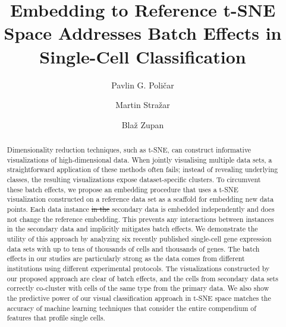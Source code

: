 \documentclass[runningheads]{llncs}
\providecommand{\DIFaddtex}[1]{{\protect\color{blue}\uwave{#1}}} %
\providecommand{\DIFdeltex}[1]{{\protect\color{red}\sout{#1}}}                      %
\providecommand{\DIFaddbegin}{} %
\providecommand{\DIFaddend}{} %
\providecommand{\DIFdelbegin}{} %
\providecommand{\DIFdelend}{} %
\providecommand{\DIFadd}[1]{\texorpdfstring{\DIFaddtex{#1}}{#1}} %
\providecommand{\DIFdel}[1]{\texorpdfstring{\DIFdeltex{#1}}{}} %
\newcommand{\DIFscaledelfig}{0.5}
\newlength{\DIFdelgraphicswidth} %
\newlength{\DIFdelgraphicsheight} %
\newcommand{\DIFaddincludegraphics}[2][]{{\color{blue}\fbox{\DIFOincludegraphics[#1]{#2}}}} %
\newcommand{\DIFdelincludegraphics}[2][]{%
\sbox{\DIFdelgraphicsbox}{\DIFOincludegraphics[#1]{#2}}%
\settoboxwidth{\DIFdelgraphicswidth}{\DIFdelgraphicsbox} %
\settoboxtotalheight{\DIFdelgraphicsheight}{\DIFdelgraphicsbox} %
\scalebox{\DIFscaledelfig}{%
\parbox[b]{\DIFdelgraphicswidth}{\usebox{\DIFdelgraphicsbox}\\[-\baselineskip] \rule{\DIFdelgraphicswidth}{0em}}\llap{\resizebox{\DIFdelgraphicswidth}{\DIFdelgraphicsheight}{%
\setlength{\unitlength}{\DIFdelgraphicswidth}%
\begin{picture}(1,1)%
\thicklines\linethickness{2pt} %
{\color[rgb]{1,0,0}\put(0,0){\framebox(1,1){}}}%
{\color[rgb]{1,0,0}\put(0,0){\line( 1,1){1}}}%
{\color[rgb]{1,0,0}\put(0,1){\line(1,-1){1}}}%
\end{picture}%
}\hspace*{3pt}}} %
} %
\DeclareRobustCommand{\DIFaddbegin}{\DIFOaddbegin \let\includegraphics\DIFaddincludegraphics} %
\DeclareRobustCommand{\DIFaddend}{\DIFOaddend \let\includegraphics\DIFOincludegraphics} %
\DeclareRobustCommand{\DIFdelbegin}{\DIFOdelbegin \let\includegraphics\DIFdelincludegraphics} %
\DeclareRobustCommand{\DIFdelend}{\DIFOaddend \let\includegraphics\DIFOincludegraphics} %
\begin{document}
%
\title{Embedding to Reference t-SNE Space Addresses Batch Effects in Single-Cell Classification}
%
%
\author{Pavlin G. Poli\v{c}ar \and
Martin Stra\v{z}ar \and
Bla\v{z} Zupan}
%
%

\maketitle

\begin{abstract}

Dimensionality reduction techniques, such as t-SNE, can construct informative
visualizations of high-dimensional data. When jointly visualising multiple data
sets, a straightforward application of these methods often fails; instead of
revealing underlying classes, the resulting visualizations expose
dataset-specific clusters. To circumvent these batch effects, we propose an
embedding procedure that uses a t-SNE visualization constructed on a reference
data set as a scaffold for embedding new data points. Each data instance \DIFdelbegin \DIFdel{in the }\DIFdelend \DIFaddbegin \DIFadd{from a
new, unseen, }\DIFaddend secondary data is embedded independently and does not change the
reference embedding. This prevents any interactions between instances in the
secondary data and implicitly mitigates batch effects. We demonstrate the
utility of this approach by analyzing six recently published single-cell gene
expression data sets with up to tens of thousands of cells and thousands of
genes. The batch effects in our studies are particularly strong as the data
comes from different institutions using different experimental protocols. The
visualizations constructed by our proposed approach are clear of batch effects,
and the cells from secondary data sets correctly co-cluster with cells of the
same type from the primary data. We also show the predictive power of our
\DIFaddbegin \DIFadd{simple, }\DIFaddend visual classification approach in t-SNE space matches the accuracy of
\DIFaddbegin \DIFadd{specialized }\DIFaddend machine learning techniques that consider the entire compendium of
features that profile single cells.

\end{abstract}
\end{document}
